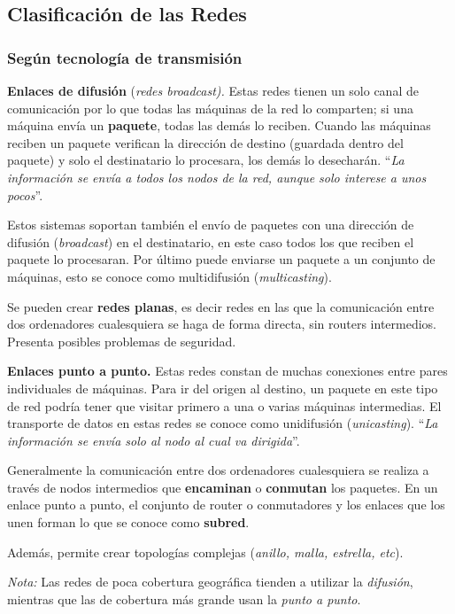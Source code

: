 \documentclass[10pt,a4paper]{article}
\begin{document}
\subsection{Clasificación de las Redes}
\subsubsection{Según tecnología de transmisión}
\begin{description}
\item \textbf{Enlaces de difusión} (\textit{redes broadcast).} Estas redes tienen un solo canal de comunicación por lo que todas las máquinas de la red lo comparten; si una máquina envía un \textbf{paquete}, todas las demás lo reciben. Cuando las máquinas reciben un paquete verifican la dirección de destino (guardada dentro del paquete) y solo el destinatario lo procesara, los demás lo desecharán. ``\textit{La información se envía a todos los nodos de la red, aunque solo interese a unos pocos}''.

Estos sistemas soportan también el envío de paquetes con una dirección de difusión (\textit{broadcast}) en el destinatario, en este caso todos los que reciben el paquete lo procesaran. Por último puede enviarse un paquete a un conjunto de máquinas, esto se conoce como multidifusión (\textit{multicasting}).

Se pueden crear \textbf{redes planas}, es decir redes en las que la comunicación entre dos ordenadores cualesquiera se haga de forma directa, sin routers intermedios. Presenta posibles problemas de seguridad.

\item \textbf{Enlaces punto a punto.} Estas redes constan de muchas conexiones entre pares individuales de máquinas. Para ir del origen al destino, un paquete en este tipo de red podría tener que visitar primero a una o varias máquinas intermedias. El transporte de datos en estas redes se conoce como unidifusión (\textit{unicasting}). ``\textit{La información se envía solo al nodo al cual va dirigida}''.

Generalmente la comunicación entre dos ordenadores cualesquiera se realiza a través de nodos intermedios que \textbf{encaminan} o \textbf{conmutan} los paquetes. En un enlace punto a punto, el conjunto de router o conmutadores y los enlaces que los unen forman lo que se conoce como \textbf{subred}.

Además, permite crear topologías complejas (\textit{anillo, malla, estrella, etc}).
\end{description}
\textit{Nota:} Las redes de poca cobertura geográfica tienden a utilizar la \textit{difusión}, mientras que las de cobertura más grande usan la \textit{punto a punto}.
\end{document}
